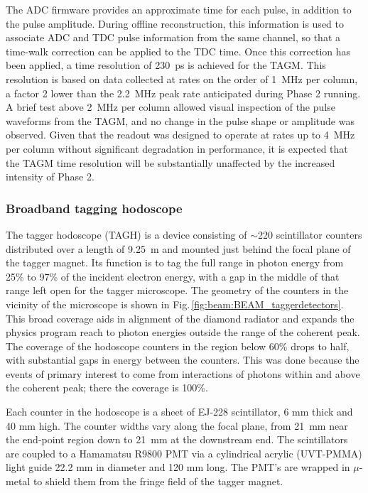 The ADC firmware provides an approximate time for each pulse, in addition to the
pulse amplitude. During offline reconstruction, this information is used to
associate ADC and TDC pulse information from the same channel, so that a
time-walk correction can be applied to the TDC time. Once this correction
has been applied, a time resolution of 230~ps is achieved for the TAGM.
This resolution is based on data collected at rates on the order of 1~MHz
per column, a factor 2 lower than the 2.2~MHz peak rate anticipated during
\GX{} Phase 2 running. A brief test above 2~MHz per column allowed visual
inspection of the pulse waveforms from the TAGM, and no change in the
pulse shape or amplitude was observed. Given that the readout was designed
to operate at rates up to 4~MHz per column without significant degradation
in performance, it is expected that the TAGM time resolution will be
substantially unaffected by the increased intensity of \GX{} Phase 2.

\subsubsection{Broadband tagging hodoscope}\label{sec:TAGHIntro}
The tagger hodoscope (TAGH) is a device consisting of $\sim$220 scintillator counters distributed over a length of 9.25~m and mounted just behind the focal plane of the tagger magnet.
Its function is to tag the full range in photon energy from 25\% to 97\%
of the incident electron energy, with a gap in the middle of that range
left open for the tagger microscope. The geometry of the counters in the
vicinity of the microscope is shown in Fig.\,\ref{fig:beam:BEAM_taggerdetectors}. 
This broad coverage aids in alignment of the diamond radiator and expands the \GX{} physics program reach to photon energies outside the range of the coherent peak.
The coverage of the hodoscope counters in the region below 60\% drops to half,
with substantial gaps in energy between the counters. This was done because
the events of primary interest to \GX{} come from interactions of photons
within and above the coherent peak; there the coverage is 100\%.

Each counter in the hodoscope is a sheet of EJ-228 scintillator, 6 mm thick and
40 mm high. The counter widths vary along the focal plane, from 21~mm near the
end-point region down to 21~mm at the downstream end. The scintillators are
coupled to a Hamamatsu R9800 PMT via a cylindrical acrylic (UVT-PMMA) light
guide 22.2 mm in diameter and 120 mm long. The PMT's are wrapped in $\mu$-metal
to shield them from the fringe field of the tagger magnet.

